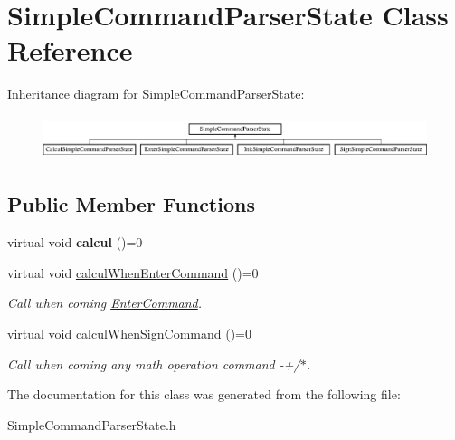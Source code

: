 \hypertarget{class_simple_command_parser_state}{}\section{Simple\+Command\+Parser\+State Class Reference}
\label{class_simple_command_parser_state}
Inheritance diagram for Simple\+Command\+Parser\+State\+:\begin{figure}[H]
\begin{center}
\leavevmode
\includegraphics[height=1.308411cm]{class_simple_command_parser_state}
\end{center}
\end{figure}
\subsection*{Public Member Functions}
\begin{DoxyCompactItemize}
\item 
\hypertarget{class_simple_command_parser_state_a49ad0185ad658fafa373ab0b379bb1f4}{}virtual void {\bfseries calcul} ()=0\label{class_simple_command_parser_state_a49ad0185ad658fafa373ab0b379bb1f4}

\item 
\hypertarget{class_simple_command_parser_state_a6282b1a0bd3a8e347e4034cdc912bf5d}{}virtual void \hyperlink{class_simple_command_parser_state_a6282b1a0bd3a8e347e4034cdc912bf5d}{calcul\+When\+Enter\+Command} ()=0\label{class_simple_command_parser_state_a6282b1a0bd3a8e347e4034cdc912bf5d}

\begin{DoxyCompactList}\small\item\em Call when coming \hyperlink{class_enter_command}{Enter\+Command}. \end{DoxyCompactList}\item 
\hypertarget{class_simple_command_parser_state_acaafb5b328a0c696d7dabcbc1e98b894}{}virtual void \hyperlink{class_simple_command_parser_state_acaafb5b328a0c696d7dabcbc1e98b894}{calcul\+When\+Sign\+Command} ()=0\label{class_simple_command_parser_state_acaafb5b328a0c696d7dabcbc1e98b894}

\begin{DoxyCompactList}\small\item\em Call when coming any math operation command -\/+/$\ast$. \end{DoxyCompactList}\end{DoxyCompactItemize}


The documentation for this class was generated from the following file\+:\begin{DoxyCompactItemize}
\item 
Simple\+Command\+Parser\+State.\+h\end{DoxyCompactItemize}
